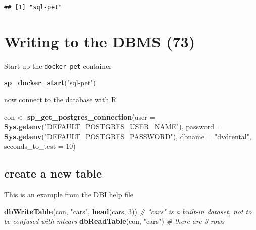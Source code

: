 \documentclass[]{book}
\newenvironment{Shaded}{\begin{snugshade}}{\end{snugshade}}
\newcommand{\CommentTok}[1]{\textcolor[rgb]{0.56,0.35,0.01}{\textit{#1}}}
\newcommand{\DataTypeTok}[1]{\textcolor[rgb]{0.13,0.29,0.53}{#1}}
\newcommand{\DecValTok}[1]{\textcolor[rgb]{0.00,0.00,0.81}{#1}}
\newcommand{\KeywordTok}[1]{\textcolor[rgb]{0.13,0.29,0.53}{\textbf{#1}}}
\newcommand{\NormalTok}[1]{#1}
\newcommand{\StringTok}[1]{\textcolor[rgb]{0.31,0.60,0.02}{#1}}
\theoremstyle{definition}
\theoremstyle{definition}
\theoremstyle{definition}
\theoremstyle{remark}
\begin{document}
\begin{verbatim}
## [1] "sql-pet"
\end{verbatim}

\hypertarget{writing-to-the-dbms-73}{%
\chapter{Writing to the DBMS (73)}\label{writing-to-the-dbms-73}}

Start up the \texttt{docker-pet} container

\begin{Shaded}
\begin{Highlighting}[]
\KeywordTok{sp_docker_start}\NormalTok{(}\StringTok{"sql-pet"}\NormalTok{)}
\end{Highlighting}
\end{Shaded}

now connect to the database with R

\begin{Shaded}
\begin{Highlighting}[]
\NormalTok{con <-}\StringTok{ }\KeywordTok{sp_get_postgres_connection}\NormalTok{(}\DataTypeTok{user =} \KeywordTok{Sys.getenv}\NormalTok{(}\StringTok{"DEFAULT_POSTGRES_USER_NAME"}\NormalTok{),}
                         \DataTypeTok{password =} \KeywordTok{Sys.getenv}\NormalTok{(}\StringTok{"DEFAULT_POSTGRES_PASSWORD"}\NormalTok{),}
                         \DataTypeTok{dbname =} \StringTok{"dvdrental"}\NormalTok{,}
                         \DataTypeTok{seconds_to_test =} \DecValTok{10}\NormalTok{)}
\end{Highlighting}
\end{Shaded}

\hypertarget{create-a-new-table}{%
\section{create a new table}\label{create-a-new-table}}

This is an example from the DBI help file

\begin{Shaded}
\begin{Highlighting}[]
\KeywordTok{dbWriteTable}\NormalTok{(con, }\StringTok{"cars"}\NormalTok{, }\KeywordTok{head}\NormalTok{(cars, }\DecValTok{3}\NormalTok{)) }\CommentTok{# "cars" is a built-in dataset, not to be confused with mtcars}
\KeywordTok{dbReadTable}\NormalTok{(con, }\StringTok{"cars"}\NormalTok{)   }\CommentTok{# there are 3 rows}
\end{Highlighting}
\end{Shaded}
\end{document}
